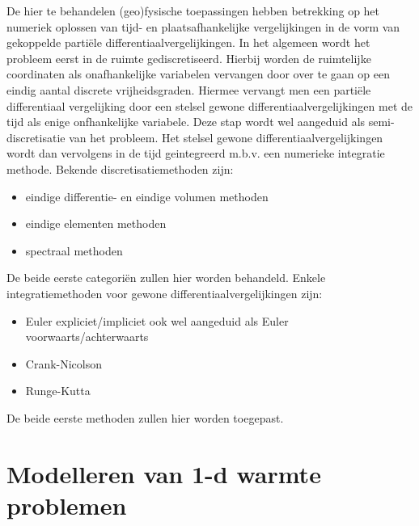 \noindent
De hier te behandelen (geo)fysische toepassingen hebben betrekking op
het numeriek oplossen van tijd- en plaatsafhankelijke vergelijkingen
in de vorm van gekoppelde parti\"{e}le differentiaalvergelijkingen.
In het algemeen wordt het probleem eerst in de ruimte gediscretiseerd.
Hierbij worden de ruimtelijke coordinaten als onafhankelijke variabelen
vervangen door over te gaan op een eindig aantal discrete 
vrijheidsgraden.
Hiermee vervangt men een parti\"{e}le differentiaal vergelijking door
een stelsel gewone differentiaalvergelijkingen met de tijd als enige
onfhankelijke variabele.
Deze stap wordt wel aangeduid als semi-discretisatie van het probleem.
Het stelsel gewone differentiaalvergelijkingen wordt dan vervolgens
in de tijd geintegreerd m.b.v. een numerieke integratie methode.
Bekende discretisatiemethoden zijn:
\begin{itemize}
\item eindige differentie- en eindige volumen methoden
\item eindige elementen methoden
\item spectraal methoden
\end{itemize}

\noindent
De beide eerste categori\"{e}n zullen hier worden behandeld.
Enkele integratiemethoden voor gewone differentiaalvergelijkingen
zijn:
\begin{itemize}
\item Euler expliciet/impliciet ook wel aangeduid als 
Euler voorwaarts/achterwaarts
\item Crank-Nicolson
\item Runge-Kutta
\end{itemize}

\noindent
De beide eerste methoden zullen hier worden toegepast.





\section{Modelleren van 1-d warmte problemen}

